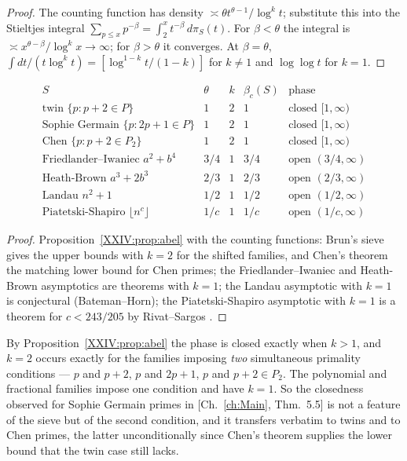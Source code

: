 \begin{proof}
The counting function has density $\asymp\theta t^{\theta-1}/\log^kt$; substitute this into
the Stieltjes integral $\sum_{p\le x}p^{-\beta}=\int_2^xt^{-\beta}\,d\pi_S(t)$.
For $\beta<\theta$ the integral is
$\asymp x^{\theta-\beta}/\log^kx\to\infty$; for $\beta>\theta$ it converges. At
$\beta=\theta$, $\int dt/(t\log^kt)=[\log^{1-k}t/(1-k)]$ for $k\ne1$ and $\log\log t$ for
$k=1$.
\end{proof}

\begin{theorem}\label{XXIV:thm:spectrum}
\[
\begin{array}{lccll}
S & \theta & k & \beta_c(S) & \text{phase}\\\hline
\text{twin }\{p:p+2\in P\} & 1 & 2 & 1 & \text{closed }[1,\infty)\\
\text{Sophie Germain }\{p:2p+1\in P\} & 1 & 2 & 1 & \text{closed }[1,\infty)\\
\text{Chen }\{p:p+2\in P_2\} & 1 & 2 & 1 & \text{closed }[1,\infty)\\
\text{Friedlander--Iwaniec }a^2+b^4 & 3/4 & 1 & 3/4 & \text{open }(3/4,\infty)\\
\text{Heath-Brown }a^3+2b^3 & 2/3 & 1 & 2/3 & \text{open }(2/3,\infty)\\
\text{Landau }n^2+1 & 1/2 & 1 & 1/2 & \text{open }(1/2,\infty)\\
\text{Piatetski-Shapiro }\lfloor n^c\rfloor & 1/c & 1 & 1/c & \text{open }(1/c,\infty)
\end{array}
\]
\end{theorem}

\begin{proof}
Proposition~\ref{XXIV:prop:abel} with the counting functions: Brun's sieve \cite{HR} gives the upper bounds
with $k=2$ for the shifted families, and Chen's theorem \cite{Chen} the matching lower bound for Chen
primes; the Friedlander--Iwaniec \cite{FI} and Heath-Brown \cite{HB} asymptotics are theorems with $k=1$; the
Landau asymptotic with $k=1$ is conjectural (Bateman--Horn); the Piatetski-Shapiro asymptotic
with $k=1$ is a theorem for $c<243/205$ by Rivat--Sargos \cite{RS}.
\end{proof}

\begin{remark}\label{XXIV:rem:dichotomy}
By Proposition~\ref{XXIV:prop:abel} the phase is closed exactly when $k>1$, and $k=2$ occurs
exactly for the families imposing \emph{two} simultaneous primality conditions --- $p$ and
$p+2$, $p$ and $2p+1$, $p$ and $p+2\in P_2$. The polynomial and fractional families impose
one condition and have $k=1$. So the closedness observed for Sophie Germain primes in
[Ch.~\ref{ch:Main}, Thm.~5.5] is not a feature of the sieve but of the second condition, and it
transfers verbatim to twins and to Chen primes, the latter unconditionally since Chen's
theorem supplies the lower bound that the twin case still lacks.
\end{remark}


